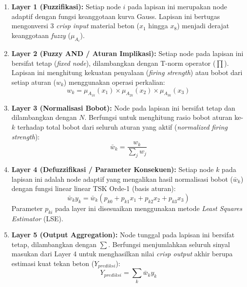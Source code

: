 \begin{enumerate}
    \item \textbf{Layer 1 (Fuzzifikasi):} 
    Setiap node $i$ pada lapisan ini merupakan node adaptif dengan fungsi keanggotaan kurva Gauss. 
    Lapisan ini bertugas mengonversi 3 \textit{crisp input} material beton ($x_1$ hingga $x_8$) menjadi derajat keanggotaan \textit{fuzzy} ($\mu_{A_i}$).
    
    \item \textbf{Layer 2 (Fuzzy AND / Aturan Implikasi):}
    Setiap node pada lapisan ini bersifat tetap (\textit{fixed node}), dilambangkan dengan T-norm operator ($\prod$). Lapisan ini menghitung kekuatan penyalaan (\textit{firing strength}) atau bobot dari setiap aturan ($w_k$) menggunakan operasi perkalian:
    \begin{equation}
    w_k = \mu_{A_{1k}}(x_1) \times \mu_{A_{2k}}(x_2) \times \mu_{A_{3k}}(x_3)
    \end{equation}
    
    \item \textbf{Layer 3 (Normalisasi Bobot):}
    Node pada lapisan ini bersifat tetap dan dilambangkan dengan $N$. Berfungsi untuk menghitung rasio bobot aturan ke-$k$ terhadap total bobot dari seluruh aturan yang aktif (\textit{normalized firing strength}):
    \begin{equation}
    \bar{w}_k = \frac{w_k}{\sum_{j} w_j}
    \end{equation}
    
    \item \textbf{Layer 4 (Defuzzifikasi / Parameter Konsekuen):}
    Setiap node $k$ pada lapisan ini adalah node adaptif yang mengalikan hasil normalisasi bobot ($\bar{w}_k$) dengan fungsi linear linear TSK Orde-1 (basis aturan):
    \begin{equation}
    \bar{w}_k y_k = \bar{w}_k (p_{k0} + p_{k1}x_1 + p_{k2}x_2 + p_{k3}x_3)
    \end{equation}
    Parameter $p_{ki}$ pada layer ini disesuaikan menggunakan metode \textit{Le\-ast Squares Estimator} (LSE).
    
    \item \textbf{Layer 5 (Output Aggregation):}
    Node tunggal pada lapisan ini bersifat tetap, dilambangkan dengan $\sum$. Berfungsi menjumlahkan seluruh sinyal masukan dari Layer 4 untuk menghasilkan nilai \textit{crisp output} akhir berupa estimasi kuat tekan beton ($Y_{prediksi}$):
    \begin{equation}
    Y_{prediksi} = \sum_{k} \bar{w}_k y_k
    \end{equation}
\end{enumerate}

